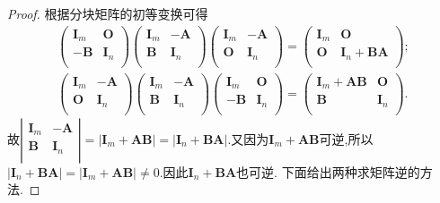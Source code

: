\documentclass[../../main.tex]{subfiles}%
\begin{document}
\begin{proof}
根据分块矩阵的初等变换可得
\begin{align}
\left( \begin{matrix}
\boldsymbol{I}_m&		\boldsymbol{O}\\
-\boldsymbol{B}&		\boldsymbol{I}_n\\
\end{matrix} \right) \left( \begin{matrix}
\boldsymbol{I}_m&		-\boldsymbol{A}\\
\boldsymbol{B}&		\boldsymbol{I}_n\\
\end{matrix} \right) \left( \begin{matrix}
\boldsymbol{I}_m&		-\boldsymbol{A}\\
\boldsymbol{O}&		\boldsymbol{I}_n\\
\end{matrix} \right) =\left( \begin{matrix}
\boldsymbol{I}_m&		\boldsymbol{O}\\
\boldsymbol{O}&		\boldsymbol{I}_n+\boldsymbol{BA}\\
\end{matrix} \right) ;\label{eq:::241211123123-----1241231---121}
\\
\left( \begin{matrix}
\boldsymbol{I}_m&		-\boldsymbol{A}\\
\boldsymbol{O}&		\boldsymbol{I}_n\\
\end{matrix} \right) \left( \begin{matrix}
\boldsymbol{I}_m&		-\boldsymbol{A}\\
\boldsymbol{B}&		\boldsymbol{I}_n\\
\end{matrix} \right) \left( \begin{matrix}
\boldsymbol{I}_m&		\boldsymbol{O}\\
-\boldsymbol{B}&		\boldsymbol{I}_n\\
\end{matrix} \right) =\left( \begin{matrix}
\boldsymbol{I}_m+\boldsymbol{AB}&		\boldsymbol{O}\\
\boldsymbol{B}&		\boldsymbol{I}_n\\
\end{matrix} \right) .\label{eq:::241211123123-----1241231---123}
\end{align}
故$\left| \begin{matrix}
\boldsymbol{I}_m&		-\boldsymbol{A}\\
\boldsymbol{B}&		\boldsymbol{I}_n\\
\end{matrix} \right|=\left| \boldsymbol{I}_m+\boldsymbol{AB} \right|=\left| \boldsymbol{I}_n+\boldsymbol{BA} \right|$.又因为$\boldsymbol{I}_m+\boldsymbol{AB}$可逆,所以$\left| \boldsymbol{I}_n+\boldsymbol{BA} \right|=\left| \boldsymbol{I}_m+\boldsymbol{AB} \right|\ne0$.因此$\boldsymbol{I}_n+\boldsymbol{BA}$也可逆.
下面给出两种求矩阵逆的方法.


\end{proof}
\end{document}

